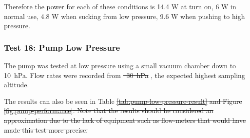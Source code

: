 \documentclass[a4paper,12pt,oneside]{article} %
\providecommand{\DIFaddtex}[1]{{\protect\color{blue}\uwave{#1}}} %
\providecommand{\DIFdeltex}[1]{{\protect\color{red}\sout{#1}}}                      %
\providecommand{\DIFaddbegin}{} %
\providecommand{\DIFaddend}{} %
\providecommand{\DIFdelbegin}{} %
\providecommand{\DIFdelend}{} %
\providecommand{\DIFadd}[1]{\texorpdfstring{\DIFaddtex{#1}}{#1}} %
\providecommand{\DIFdel}[1]{\texorpdfstring{\DIFdeltex{#1}}{}} %
\newcommand{\DIFscaledelfig}{0.5}
\newlength{\DIFdelgraphicswidth} %
\newlength{\DIFdelgraphicsheight} %
\newcommand{\DIFaddincludegraphics}[2][]{{\color{blue}\fbox{\DIFOincludegraphics[#1]{#2}}}} %
\newcommand{\DIFdelincludegraphics}[2][]{%
\sbox{\DIFdelgraphicsbox}{\DIFOincludegraphics[#1]{#2}}%
\settoboxwidth{\DIFdelgraphicswidth}{\DIFdelgraphicsbox} %
\settoboxtotalheight{\DIFdelgraphicsheight}{\DIFdelgraphicsbox} %
\scalebox{\DIFscaledelfig}{%
\parbox[b]{\DIFdelgraphicswidth}{\usebox{\DIFdelgraphicsbox}\\[-\baselineskip] \rule{\DIFdelgraphicswidth}{0em}}\llap{\resizebox{\DIFdelgraphicswidth}{\DIFdelgraphicsheight}{%
\setlength{\unitlength}{\DIFdelgraphicswidth}%
\begin{picture}(1,1)%
\thicklines\linethickness{2pt} %
{\color[rgb]{1,0,0}\put(0,0){\framebox(1,1){}}}%
{\color[rgb]{1,0,0}\put(0,0){\line( 1,1){1}}}%
{\color[rgb]{1,0,0}\put(0,1){\line(1,-1){1}}}%
\end{picture}%
}\hspace*{3pt}}} %
} %
\DeclareRobustCommand{\DIFaddbegin}{\DIFOaddbegin \let\includegraphics\DIFaddincludegraphics} %
\DeclareRobustCommand{\DIFaddend}{\DIFOaddend \let\includegraphics\DIFOincludegraphics} %
\DeclareRobustCommand{\DIFdelbegin}{\DIFOdelbegin \let\includegraphics\DIFdelincludegraphics} %
\DeclareRobustCommand{\DIFdelend}{\DIFOaddend \let\includegraphics\DIFOincludegraphics} %
\begin{document}
Therefore the power for each of these conditions is 14.4 W at turn on, 6 W in normal use, 4.8 W when sucking from low pressure, 9.6 W when pushing to high pressure.

\subsubsection{Test 18: Pump Low Pressure}\label{subsection:pumplowpressuretest}

The pump was tested at low pressure using a small vacuum chamber down to \SI{10}{\hecto\pascal}. Flow rates were recorded from \DIFdelbegin \DIFdel{\mbox{%
\SI{30}{\hecto\pascal}}\hspace{0pt}%
}\DIFdelend \DIFaddbegin \DIFadd{\mbox{%
\SI{75}{\hecto\pascal}}\hspace{0pt}%
}\DIFaddend , the expected highest sampling altitude.

 The results can also be seen in Table \DIFdelbegin \DIFdel{\ref{tab:pump-low-pressure-result} and Figure \ref{fig:pump-performance}.
Note that the results should be considered an approximation due to the lack of equipment such as flow-meters that would have made this test more precise. 
}\DIFdelend \DIFaddbegin \DIFadd{\ref{tab:flowratetest} and Figure \ref{fig:pump-performance-lowpressue}.
}\DIFaddend 
\end{document}
